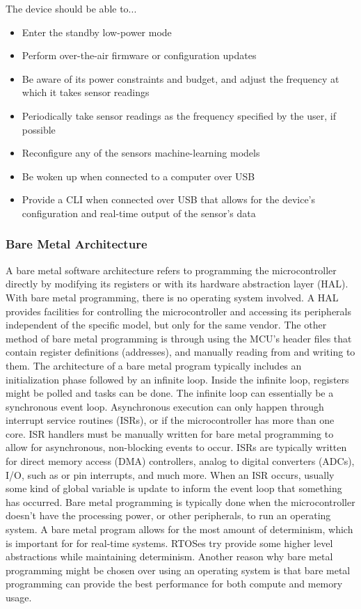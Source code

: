 The device should be able to...
\begin{itemize}
	\item Enter the standby low-power mode
	\item Perform over-the-air firmware or configuration updates
	\item Be aware of its power constraints and budget, and adjust the
		frequency at which it takes sensor readings
	\item Periodically take sensor readings as the frequency specified by the
		user, if possible
	\item Reconfigure any of the sensors machine-learning models
	\item Be woken up when connected to a computer over USB
	\item Provide a CLI when connected over USB that allows for the device's
		configuration and real-time output of the sensor's data
\end{itemize}

\subsubsection{Bare Metal Architecture}
A bare metal software architecture refers to programming the microcontroller
directly by modifying its registers or with its hardware abstraction layer
(HAL). With bare metal programming, there is no operating system involved. A
HAL provides facilities for controlling the microcontroller and accessing its
peripherals independent of the specific model, but only for the same vendor. The
other method of bare metal programming is through using the MCU's header files
that contain register definitions (addresses), and manually reading from and
writing to them. The architecture of a bare metal program typically includes an
initialization phase followed by an infinite loop. Inside the infinite loop,
registers might be polled and tasks can be done. The infinite loop can
essentially be a synchronous event loop. Asynchronous execution can only happen
through interrupt service routines (ISRs), or if the microcontroller has more
than one core. ISR handlers must be manually written for bare metal programming
to allow for asynchronous, non-blocking events to occur. ISRs are typically
written for direct memory access (DMA) controllers, analog to digital converters
(ADCs), I/O, such as \iic or pin interrupts, and much more. When an ISR occurs,
usually some kind of global variable is update to inform the event loop that
something has occurred. Bare metal programming is typically done when the
microcontroller doesn't have the processing power, or other peripherals, to run
an operating system. A bare metal program allows for the most amount of
determinism, which is important for for real-time systems. RTOSes try provide
some higher level abstractions while maintaining determinism. Another reason why
bare metal programming might be chosen over using an operating system is that
bare metal programming can provide the best performance for both compute and
memory usage.

